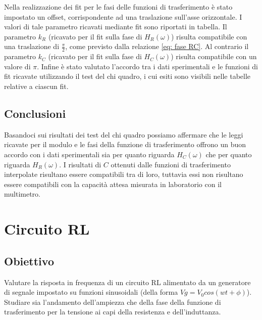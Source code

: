 \documentclass[a4paper]{article}
\begin{document}
Nella realizzazione dei fit per le fasi delle funzioni di trasferimento è stato impostato un offset, corrispondente ad una traslazione sull'asse orizzontale. I valori di tale parametro ricavati mediante fit sono riportati in tabella. Il parametro $k_R$ (ricavato per il fit sulla fase di $H_R(\omega)$) risulta compatibile con una traslazione di $\frac{\pi}{2}$, come previsto dalla relazione \ref{eq: fase RC}. Al contrario il parametro $k_C$ (ricavato per il fit sulla fase di $H_C(\omega)$) risulta compatibile con un valore di $\pi$.
Infine è stato valutato l'accordo tra i dati sperimentali e le funzioni di fit ricavate utilizzando il test del chi quadro, i cui esiti sono visibili nelle tabelle relative a ciascun fit.

\subsection{Conclusioni}
Basandoci sui risultati dei test del chi quadro possiamo affermare che le leggi ricavate per il modulo e le fasi della funzione di trasferimento offrono un buon accordo con i dati sperimentali sia per quanto riguarda $H_C(\omega)$ che per quanto riguarda $H_R(\omega)$. I risultati di $C$ ottenuti dalle funzioni di trasferimento interpolate risultano essere compatibili tra di loro, tuttavia essi non risultano essere compatibili con la capacità attesa misurata in laboratorio con il multimetro. 



\section{Circuito RL}
\subsection{Obiettivo}
Valutare la risposta in frequenza di un circuito RL alimentato da un generatore di segnale impostato su funzioni sinusoidali (della forma 
$Vg = V_{0} cos(wt + \phi)$). Studiare sia l'andamento dell'ampiezza che della fase della funzione di trasferimento per la tensione ai capi della resistenza e dell'induttanza.
\end{document}
